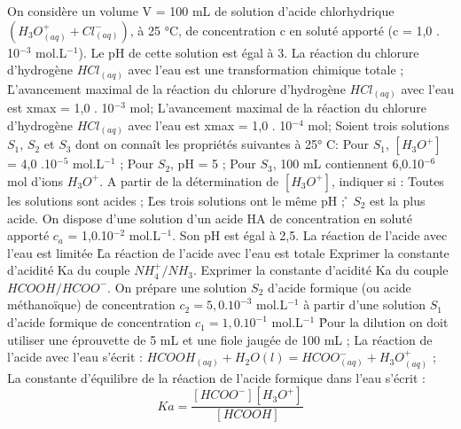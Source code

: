 \q	
   On considère un volume V = 100 mL de solution d'acide chlorhydrique $(H_3O^+_{(aq)} + Cl^-_{(aq)})$, à 25 °C, de concentration c en soluté apporté (c = 1,0 . 10$^{-3}$ mol.L$^{-1}$). Le pH de cette solution est égal à 3. 
\rv
  La réaction du chlorure d'hydrogène $HCl_{(aq)}$ avec l'eau est une transformation chimique totale ;
\r
  L'avancement maximal de la réaction du chlorure d'hydrogène $HCl_{(aq)}$ avec l'eau est xmax = 1,0 . 10$^{-3}$ mol;
  \rv
  L'avancement maximal de la réaction du chlorure d'hydrogène $HCl_{(aq)}$ avec l'eau est xmax = 1,0 . 10$^{-4}$ mol;
 \q	
Soient trois solutions $S_1$, $S_2$ et $S_3$ dont on connaît les propriétés suivantes à 25° C:
Pour $S_1$, $[H_3O^+]$ = 4,0 .10$^{-5}$ mol.L$^{-1}$ ;
Pour $S_2$, pH = 5 ;
Pour $S_3$, 100 mL contiennent 6,0.10$^{-6}$ mol d'ions $H_3O^+$.
A partir de la détermination de $[H_3O^+]$, indiquer si :
\rv
Toutes les solutions sont acides ;
\r
Les trois solutions ont le même pH ;
\r
$S_2$ est la plus acide.
\q	
On dispose d'une solution d'un acide HA de concentration en soluté apporté $c_a$ = 1,0.10$^{-2}$  mol.L$^{-1}$. Son pH est égal à  2,5.
\rv
La réaction de l'acide avec l'eau est limitée 
\r
La réaction de l'acide avec l'eau est totale
\q	
Exprimer la constante d'acidité Ka du couple $NH_4^+/ NH_3$.
\q	Exprimer la constante d'acidité Ka du couple $HCOOH/HCOO^{-}$.
   \q	
On prépare une solution $S_2$ d'acide formique (ou acide méthanoïque) de concentration        $c_2 = 5,0 . 10^{-3}$ mol.L$^{-1}$ à partir d'une solution $S_1$ d'acide formique de concentration $c_1 =1,0 . 10^{-1}$ mol.L$^{-1}$ 
\r
Pour la dilution on doit utiliser une éprouvette de 5 mL et une fiole jaugée de 100 mL ;
\rv 
La réaction de l'acide avec l'eau s'écrit :
$HCOOH_{(aq)}+H_2O(l) = HCOO^{-} _{(aq)}+ H_3O^+ _{(aq)}$ ;
\rv
La constante d'équilibre de la réaction de l'acide formique dans l'eau s'écrit :
$$Ka=\dfrac{[HCOO^{-}][H_3O^+]}{[HCOOH]}$$
